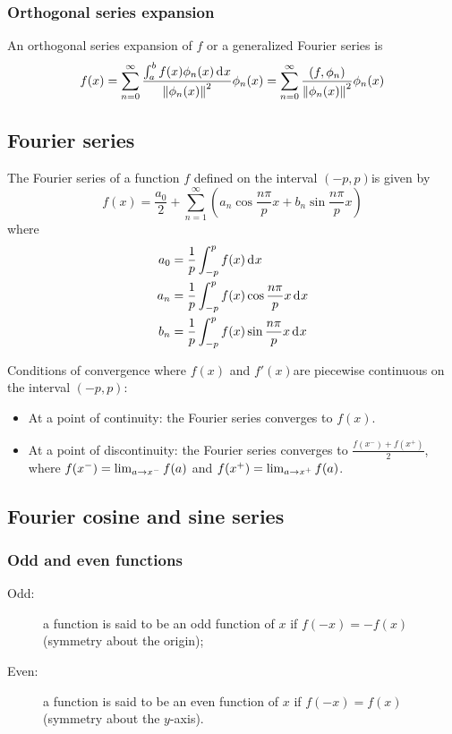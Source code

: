 \documentclass[10pt, twocolumn]{article}
\begin{document}
\subsubsection{Orthogonal series expansion}
An orthogonal series expansion of \(f\) or a generalized Fourier series is
\[
  f(x) = \sum_{n = 0}^\infty{\frac{\int_a^b{f(x)\phi_n(x) \,\mathrm{d}^{} x}}{\left\| \phi_n(x) \right\|^2}\phi_n(x)} = \sum_{n = 0}^\infty{\frac{(f,\phi_n)}{\left\| \phi_n(x) \right\|^2}\phi_n(x)}
\]


\subsection{Fourier series}
The Fourier series of a function \(f\) defined on the interval \((-p,p)\)is given by
\[
  f(x) = \frac{a_0}{2} + \sum_{n = 1}^\infty \left( a_n \cos{\frac{n \pi}{p}x} + b_n \sin{\frac{n \pi}{p} x} \right)
\]
where
\begin{align*}
  a_0 & = \frac{1}{p} \int_{-p}^p{f(x) \,\mathrm{d}^{} x}                         \\
  a_n & = \frac{1}{p} \int_{-p}^p{f(x) \cos{\frac{n \pi}{p}x} \,\mathrm{d}^{} x}  \\
  b_n & = \frac{1}{p} \int_{-p}^p{f(x) \sin{\frac{n \pi}{p} x} \,\mathrm{d}^{} x}
\end{align*}

Conditions of convergence where \(f(x)\) and \(f'(x)\)are piecewise continuous on the interval \((-p,p)\):
\begin{itemize}
  \item At a point of continuity: the Fourier series converges to \(f(x)\).
  \item At a point of discontinuity: the Fourier series converges to \(\frac{f(x^-) + f(x^+)}{2}\), where \(f(x^-) = \lim_{a \to x^{-}}{f(a)}\) and \(f(x^+) = \lim_{a \to x^{+}}{f(a)}\).
\end{itemize}


\subsection{Fourier cosine and sine series}
\subsubsection{Odd and even functions}
\begin{description}
  \item[Odd:] a function is said to be an odd function of \(x\) if \(f(-x) = -f(x)\) (symmetry about the origin);
  \item[Even:] a function is said to be an even function of \(x\) if \(f(-x) = f(x)\) (symmetry about the \(y\)-axis).
\end{description}
\end{document}
